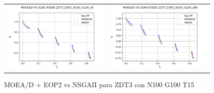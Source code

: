 \begin{figure}[H]
\begin{tabular}{c c}
    \includegraphics[scale=0.5]{figures/ZDT3_EOP2_N100_G100_T15/s9_comp.png} &
    \includegraphics[scale=0.5]{figures/ZDT3_EOP2_N100_G100_T15/s99_comp.png}\\
    \end{tabular}
    \caption{\centering MOEA/D + EOP2 vs NSGAII para ZDT3 con N100 G100 T15}
    \label{fig:3}
\end{figure}

